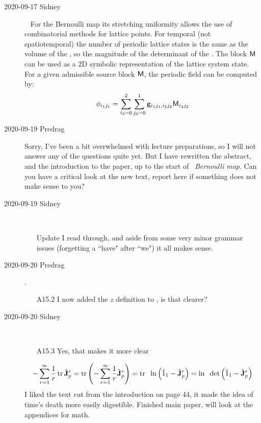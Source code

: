 \begin{description}
\item[2020-09-17 Sidney]~
For the Bernoulli map its stretching uniformity allows the use of combinatorial methods for lattice points. For temporal (not spatiotemporal) the number of periodic lattice states is the same as the volume of the {\fundPip}, so the magnitude of the determinant of the {\jacobianOrb}. The block $\mathsf{M}$ can be used as a 2D symbolic representation of the lattice system state. For a given admissible source block $\mathsf{M}$, the periodic field can be computed by:
\[
\phi_{i_1j_1}=\sum_{i_2=0}^2\sum_{j_2=0}^1\mathbf{g}_{i_1j_1,i_2j_2}\mathsf{M}_{i_2j_2}
\]


\item[2020-09-19 Predrag]
Sorry, I've been a bit overwhelmed with lecture preparations, so
I will not answer any of the questions quite yet. But I have rewritten the
abstract, and the introduction to the paper, up to
the start of ~{\em Bernoulli map}.
Can you have a critical look at the new text, report here if
something does not make sense to you?

\item[2020-09-19 Sidney]~~
\begin{itemize}
	\item[Update]
I read through, and aside from some very minor grammar issues (forgetting
a ``have" after ``we")
it all makes sense.
\end{itemize}

\item[2020-09-20 Predrag].
\begin{itemize}
	\item[A15.2]
I now added the $z$ definition to ,
is that clearer?
\end{itemize}

\item[2020-09-20 Sidney]~~
\begin{itemize}
	\item[A15.3]
Yes, that makes it more clear
\end{itemize}
$$-\sum^{\infty}_{r=1}\frac{1}{r}\mathop{\mathrm{tr}}\nolimits\hat{\mathbf{J}}_p^r
=\mathop{\mathrm{tr}}\nolimits\left(-\sum^{\infty}_{r=1}\frac{1}{r}\hat{\mathbf{J}}_p^r\right)
= \mathop{\mathrm{tr}}\nolimits\hspace{2mm}\ln\left(\hat{1}_1-\hat{\mathbf{J}}_p^r\right)
= \ln\hspace{2mm}\det\left(\hat{1}_1-\hat{\mathbf{J}}_p^r\right)$$
I liked the text cut from the introduction on page 44, it made the idea of time's death more easily digestible. Finished main paper, will look at the appendices for math.


\end{description}
